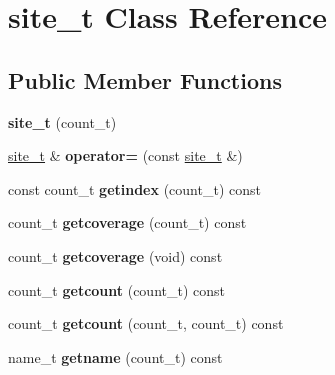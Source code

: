 \hypertarget{classsite__t}{\section{site\-\_\-t Class Reference}
\label{classsite__t}
}
\subsection*{Public Member Functions}
\begin{DoxyCompactItemize}
\item 
\hypertarget{classsite__t_a1b229f6dfa9ae806c303796532643c73}{{\bfseries site\-\_\-t} (count\-\_\-t)}\label{classsite__t_a1b229f6dfa9ae806c303796532643c73}

\item 
\hypertarget{classsite__t_a542b77e43a4cd23297a3a23f9fed5fda}{\hyperlink{classsite__t}{site\-\_\-t} \& {\bfseries operator=} (const \hyperlink{classsite__t}{site\-\_\-t} \&)}\label{classsite__t_a542b77e43a4cd23297a3a23f9fed5fda}

\item 
\hypertarget{classsite__t_a3dcf14f282c64e1ada24e8ec9030dbf2}{const count\-\_\-t {\bfseries getindex} (count\-\_\-t) const }\label{classsite__t_a3dcf14f282c64e1ada24e8ec9030dbf2}

\item 
\hypertarget{classsite__t_a297cc41045d52e8b230613d703b832b4}{count\-\_\-t {\bfseries getcoverage} (count\-\_\-t) const }\label{classsite__t_a297cc41045d52e8b230613d703b832b4}

\item 
\hypertarget{classsite__t_a64ab0087bbd3ed8c7887df11d475f1ad}{count\-\_\-t {\bfseries getcoverage} (void) const }\label{classsite__t_a64ab0087bbd3ed8c7887df11d475f1ad}

\item 
\hypertarget{classsite__t_a0a60091963ea82e08b6dce3955318e79}{count\-\_\-t {\bfseries getcount} (count\-\_\-t) const }\label{classsite__t_a0a60091963ea82e08b6dce3955318e79}

\item 
\hypertarget{classsite__t_a71f6c790be549bd17d7fa7c591712f37}{count\-\_\-t {\bfseries getcount} (count\-\_\-t, count\-\_\-t) const }\label{classsite__t_a71f6c790be549bd17d7fa7c591712f37}

\item 
\hypertarget{classsite__t_a0e3593b76b99b27e959cb81d4e70e3d1}{name\-\_\-t {\bfseries getname} (count\-\_\-t) const }\label{classsite__t_a0e3593b76b99b27e959cb81d4e70e3d1}


\end{DoxyCompactItemize}
